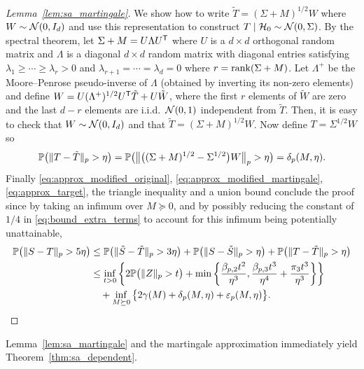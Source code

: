 \begin{proof}[Lemma~\ref{lem:sa_martingale}]
  We show how to write
  $\tilde T = (\Sigma + M)^{1/2} W$
  where $W \sim \cN(0,I_d)$
  and use this representation to construct
  $T \mid \cH_0 \sim \cN(0, \Sigma)$.
  By the spectral theorem, let $\Sigma + M = U \Lambda U^\T$
  where $U$ is a $d \times d$ orthogonal random matrix
  and $\Lambda$ is a diagonal $d \times d$ random matrix with
  diagonal entries satisfying
  $\lambda_1 \geq \cdots \geq \lambda_r > 0$
  and $\lambda_{r+1} = \cdots = \lambda_d = 0$
  where $r = \rank (\Sigma + M)$.
  Let $\Lambda^+$ be the Moore--Penrose pseudo-inverse of $\Lambda$
  (obtained by inverting its non-zero elements) and define
  $W = U (\Lambda^+)^{1/2} U^\T \tilde T + U \tilde W$, where
  the first $r$ elements of $\tilde W$ are zero
  and the last $d-r$ elements are i.i.d.\ $\cN(0,1)$
  independent from $\tilde T$.
  Then, it is easy to check that
  $W \sim \cN(0, I_d)$ and that
  $\tilde T = (\Sigma + M)^{1/2} W$.
  Now define $T = \Sigma^{1/2} W$ so
  \begin{equation}%
    \label{eq:approx_target}
    \P\big(\|T - \tilde T\|_p > \eta\big)
    = \P\big(\big\|\big((\Sigma + M)^{1/2}
    - \Sigma^{1/2} \big) W \big\|_p>\eta \big)
    = \delta_p(M, \eta).
  \end{equation}
  Finally
  \eqref{eq:approx_modified_original},
  \eqref{eq:approx_modified_martingale},
  \eqref{eq:approx_target},
  the triangle inequality
  and a union bound conclude the proof since
  by taking an infimum over $M \succeq 0$,
  and by possibly reducing the constant of $1/4$ in
  \eqref{eq:bound_extra_terms} to account for
  this infimum being potentially unattainable,
  \begin{align*}
    \P\big(\|S-T\|_p > 5\eta\big)
    &\leq
    \P\big(\|\tilde S - \tilde T \|_p > 3\eta \big)
    +\P\big(\|S - \tilde S \|_p > \eta\big)
    +\P\big(\|T - \tilde T \|_p > \eta\big) \\
    &\leq
    \inf_{t>0}
    \left\{
      2 \P\big( \|Z\|_p > t \big)
      + \min\left\{
        \frac{\beta_{p,2} t^2}{\eta^3},
        \frac{\beta_{p,3} t^3}{\eta^4}
        + \frac{\pi_3 t^3}{\eta^3}
      \right\}
    \right\} \\
    &\quad+
    \inf_{M \succeq 0}
    \big\{ 2\gamma(M) + \delta_p(M,\eta)
    + \varepsilon_p(M, \eta)\big\}.
  \end{align*}
\end{proof}

Lemma~\ref{lem:sa_martingale} and the martingale approximation
immediately yield Theorem~\ref{thm:sa_dependent}.

